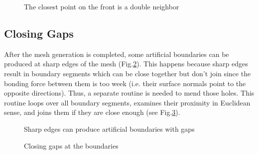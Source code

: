 \documentclass[12pt]{article}
\begin{document}
\begin{enumerate}
\begin{figure}
\center
{}
\caption{\label{frontneib2}The closest point on the front is a double neighbor}
\end{figure}

\end{enumerate}

\subsection{Closing Gaps}


After the mesh generation is completed, some artificial boundaries can be
produced at sharp edges of the mesh (Fig.\ref{gap}). 
This happens because sharp edges result in boundary segments which can be close
together but don't join since the bonding force between them is too week (i.e.
their surface normals point to the opposite directions). Thus, a separate
routine is needed to mend those holes. This routine loops over all boundary
segments, examines their proximity in Euclidean sense, and joins them if they
are close enough (see Fig.\ref{closegaps}). 

\begin{figure}
\center
{}
\caption{\label{gap}Sharp edges can produce artificial boundaries with gaps}
\end{figure}

\begin{figure}
\center
{}
\caption{\label{closegaps}Closing gaps at the boundaries}
\end{figure}
\end{document}
